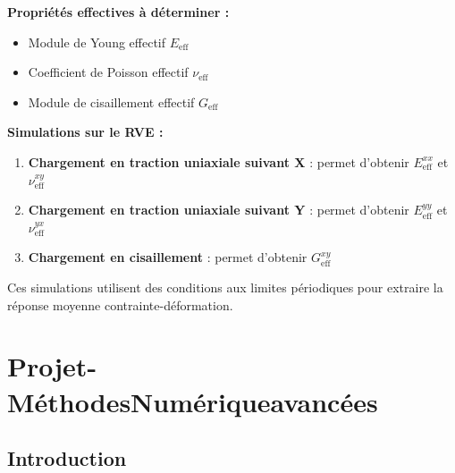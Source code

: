 \documentclass{rapportECL}
\begin{document}
\begin{tcolorbox}[colback=white!5!white,colframe=blue!75!black]
\textbf{Propriétés effectives à déterminer :}
\begin{itemize}[noitemsep]
\item Module de Young effectif $E_{\text{eff}}$
\item Coefficient de Poisson effectif $\nu_{\text{eff}}$
\item Module de cisaillement effectif $G_{\text{eff}}$
\end{itemize}

\textbf{Simulations sur le RVE :}
\begin{enumerate}[noitemsep]
\item \textbf{Chargement en traction uniaxiale suivant X} : permet d'obtenir $E_{\text{eff}}^{xx}$ et $\nu_{\text{eff}}^{xy}$
\item \textbf{Chargement en traction uniaxiale suivant Y} : permet d'obtenir $E_{\text{eff}}^{yy}$ et $\nu_{\text{eff}}^{yx}$
\item \textbf{Chargement en cisaillement} : permet d'obtenir $G_{\text{eff}}^{xy}$
\end{enumerate}
Ces simulations utilisent des conditions aux limites périodiques pour extraire la réponse moyenne contrainte-déformation.
\end{tcolorbox}


































\newpage



\section{Projet-MéthodesNumériqueavancées}

\subsection{Introduction}
\end{document}
